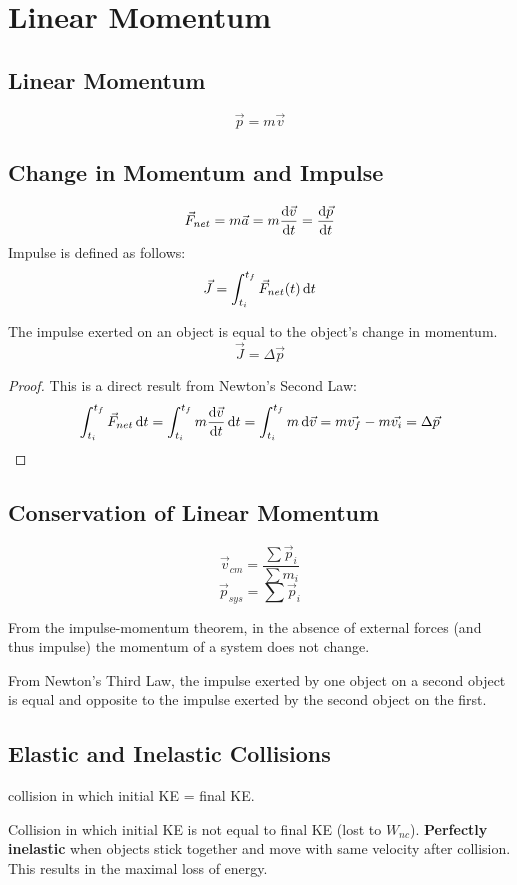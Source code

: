 \documentclass{article}
\begin{document}
\newpage

\section{Linear Momentum}

\subsection{Linear Momentum}
\[\vec{p} = m \vec{v}\]
\subsection{Change in Momentum and Impulse}
\[\vec{F}_{net} = m\vec{a} = m \odv{\vec{v}}{t} = \odv{\vec{p}}{t} \]
Impulse is defined as follows:
\[\vec{J} = \int_{t_i}^{t_f} \vec{F}_{net}(t) \odif{t}\]

\begin{definition}
    The impulse exerted on an object is equal to the object's change in momentum.
    \[\vec{J} = \Delta \vec{p}\]
    \begin{proof}
        This is a direct result from Newton's Second Law:
        \[\int_{t_i}^{t_f} \vec{F}_{net} \odif{t} = \int_{t_i}^{t_f} m \odv{\vec{v}}{t} \odif{t} = \int_{t_i}^{t_f} m \odif{\vec{v}} = m\vec{v_f} - m\vec{v_i} = \Delta \vec{p}\]
    \end{proof}
\end{definition}
\subsection{Conservation of Linear Momentum}
\[\vec{v}_{cm} = \frac{\sum \vec{p}_i}{\sum m_i}\]
\[\vec{p}_{sys} = \sum \vec{p}_i\]

From the impulse-momentum theorem, in the absence of external forces (and thus impulse) the momentum of a system does not change.

From Newton's Third Law, the impulse exerted by one object on a second object is equal and opposite to the impulse exerted by the second object on the first.

\subsection{Elastic and Inelastic Collisions}

\begin{definition}
    collision in which initial KE = final KE.
\end{definition}
\begin{definition}
    Collision in which initial KE is not equal to final KE (lost to $W_{nc}$).
    \textbf{Perfectly inelastic} when objects stick together and move with same velocity after collision.
    This results in the maximal loss of energy. 
\end{definition}
\end{document}

